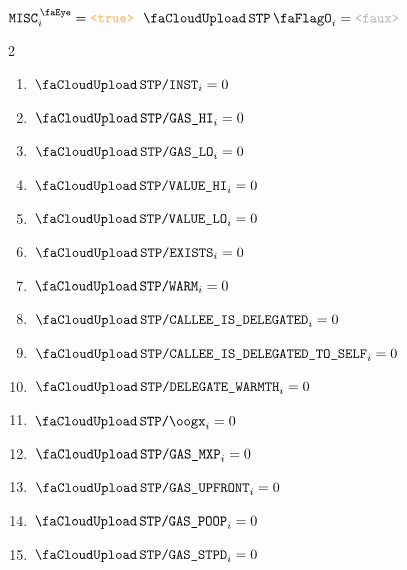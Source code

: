 \item[\underline{\underline{For \stpMod{}-columns:}}]
	\If $\peekMisc _{i} = \true$ \et $\miscStpFlag _{i} = \false$ \Then
	\begin{multicols}{2}
		\begin{enumerate}
			\item $\miscStpInst                  _{i} = 0$
			\item $\miscStpGasHi                 _{i} = 0$
			\item $\miscStpGasLo                 _{i} = 0$
			\item $\miscStpValueHi               _{i} = 0$
			\item $\miscStpValueLo               _{i} = 0$
			\item $\miscStpAccExists             _{i} = 0$
			\item $\miscStpAccWarmth             _{i} = 0$
			\item $\miscStpCalleeIsDelegated     _{i} = 0$
			\item $\miscStpCalleeIsSelfDelegated _{i} = 0$
			\item $\miscStpDelegateWarmth        _{i} = 0$
			\item $\miscStpOogx                  _{i} = 0$
			\item $\miscStpGasMxp                _{i} = 0$
			\item $\miscStpGasUpfront            _{i} = 0$
			\item $\miscStpGasPoop               _{i} = 0$
			\item $\miscStpGasStipend            _{i} = 0$
		\end{enumerate}
	\end{multicols}

